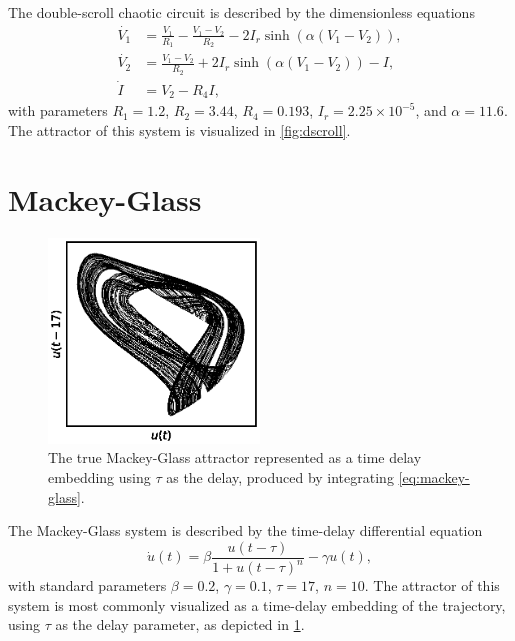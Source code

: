 The double-scroll chaotic circuit is described by the dimensionless equations
\begin{equation}
 \begin{aligned}
   \dot{V_1} &= \frac{V_1}{R_1} - \frac{V_1 - V_2}{R_2} - 2 I_r \sinh\left(\alpha(V_1 - V_2)\right), \\
   \dot{V_2} &= \frac{V_1 - V_2}{R_2} + 2 I_r \sinh\left(\alpha(V_1 - V_2)\right) - I, \\
   \dot{I} &= V_2 - R_4 I,
 \end{aligned}
 \label{eq:dscroll}
\end{equation}
with parameters $R_1 = 1.2$, $R_2 = 3.44$, $R_4 = 0.193$, $I_r = 2.25
\times 10^{-5}$, and $\alpha = 11.6$.\cite{gauthier1996} The attractor
of this system is visualized in \cref{fig:dscroll}.

\section{Mackey-Glass}

\begin{figure}
  \includegraphics[width=0.5\textwidth]{figures/mackey-glass}
  \caption{The true Mackey-Glass attractor represented as a time delay embedding using $\tau$ as the delay, produced by integrating \cref{eq:mackey-glass}.}%
  \label{fig:mackey-glass}
\end{figure}

The Mackey-Glass system is described by the time-delay differential equation
\begin{equation}
  \dot{u}(t) = \beta \frac{u(t - \tau)}{1 + u(t - \tau)^n} - \gamma u(t),
  \label{eq:mackey-glass}
\end{equation}
with standard parameters $\beta = 0.2$, $\gamma = 0.1$, $\tau = 17$,
$n = 10$.\cite{mackey1977} The attractor of this system is most
commonly visualized as a time-delay embedding of the trajectory, using
$\tau$ as the delay parameter, as depicted in \cref{fig:mackey-glass}.
